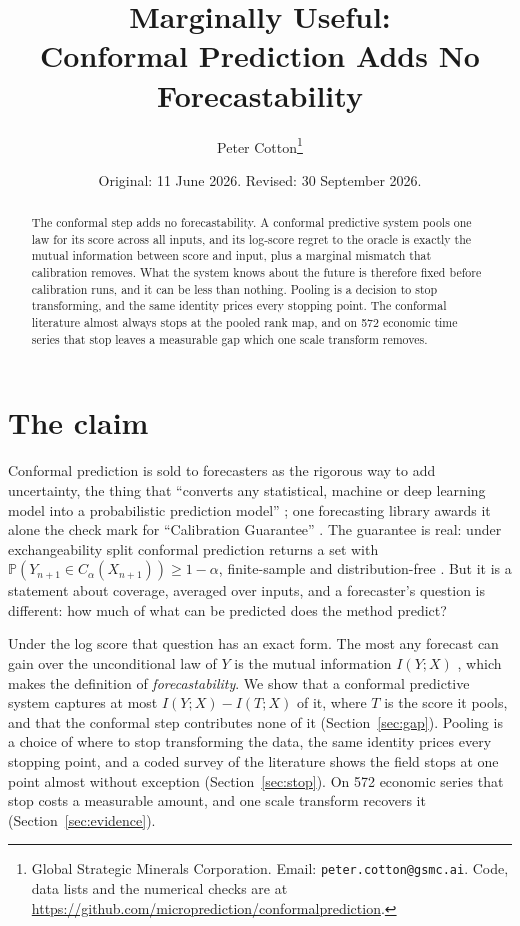 \documentclass[11pt]{article}
\title{Marginally Useful:\\ Conformal Prediction Adds No Forecastability}
\author{}
\author{Peter Cotton\thanks{Global Strategic Minerals Corporation.
  Email: \texttt{peter.cotton@gsmc.ai}. Code, data lists and the numerical checks are at
  \url{https://github.com/microprediction/conformalprediction}.}}
\date{Original: 11 June 2026. Revised: 30 September 2026.}
\theoremstyle{definition}
\renewcommand{\Pr}{\mathbb{P}}
\begin{document}
\maketitle

\begin{abstract}
\noindent
The conformal step adds no forecastability. A conformal predictive system pools one law for
its score across all inputs, and its log-score regret to the oracle is exactly the mutual
information between score and input, plus a marginal mismatch that calibration removes.
What the system knows about the future is therefore fixed before calibration runs, and it
can be less than nothing. Pooling is a decision to stop transforming, and the same identity
prices every stopping point. The conformal literature almost always stops at the pooled
rank map, and on 572 economic time series that stop leaves a measurable gap which one
scale transform removes.
\end{abstract}

\section{The claim}

Conformal prediction is sold to forecasters as the rigorous way to add uncertainty, the thing
that ``converts any statistical, machine or deep learning model into a probabilistic
prediction model'' \citep{manokhin_neuralprophet}; one forecasting library awards it alone
the check mark for ``Calibration Guarantee'' \citep{nixtla_conformal}. The guarantee is
real: under exchangeability split conformal prediction returns a set with
$\Pr(Y_{n+1}\in C_\alpha(X_{n+1}))\ge1-\alpha$, finite-sample and distribution-free
\citep{vovk2005algorithmic,lei2018distribution}. But it is a statement about coverage,
averaged over inputs, and a forecaster's question is different: how much of what can be
predicted does the method predict?

Under the log score that question has an exact form. The most any forecast can gain over the
unconditional law of $Y$ is the mutual information $I(Y;X)$ \citep{delsole2004}, which
\citet{catt2026} makes the definition of \emph{forecastability}. We show that a conformal
predictive system captures at most $I(Y;X)-I(T;X)$ of it, where $T$ is the score it pools,
and that the conformal step contributes none of it (Section~\ref{sec:gap}). Pooling is a
choice of where to stop transforming the data, the same identity prices every stopping
point, and a coded survey of the literature shows the field stops at one point almost
without exception (Section~\ref{sec:stop}). On 572 economic series that stop costs a
measurable amount, and one scale transform recovers it (Section~\ref{sec:evidence}).
\end{document}

